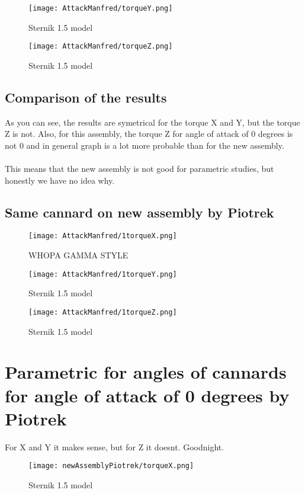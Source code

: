 \begin{figure}[H]
    \centering
    \texttt{[image: AttackManfred/torqueY.png]}
    \caption{Sternik 1.5 model}
\end{figure}

\begin{figure}[H]
    \centering
    \texttt{[image: AttackManfred/torqueZ.png]}
    \caption{Sternik 1.5 model}
\end{figure}

\subsection{Comparison of the results}
As you can see, the results are symetrical for the torque X and Y, but the torque Z is not. 
Also, for this assembly, the torque Z for angle of attack of 0 degrees is not 0 and in general
graph is a lot more probable than for the new assembly. \\\\
This means that the new assembly is not good for parametric studies, but honestly we have no idea
why.

\subsection{Same cannard on new assembly by Piotrek}

\begin{figure}[H]
    \centering
    \texttt{[image: AttackManfred/1torqueX.png]}
    \caption{WHOPA GAMMA STYLE}
\end{figure}

\begin{figure}[H]
    \centering
    \texttt{[image: AttackManfred/1torqueY.png]}
    \caption{Sternik 1.5 model}
\end{figure}

\begin{figure}[H]
    \centering
    \texttt{[image: AttackManfred/1torqueZ.png]}
    \caption{Sternik 1.5 model}
\end{figure}
\newpage
\section{Parametric for angles of cannards for angle of attack of 0 degrees by Piotrek}
For X and Y it makes sense, but for Z it doesnt. Goodnight.

\begin{figure}[H]
    \centering
    \texttt{[image: newAssemblyPiotrek/torqueX.png]}
    \caption{Sternik 1.5 model}
\end{figure}

